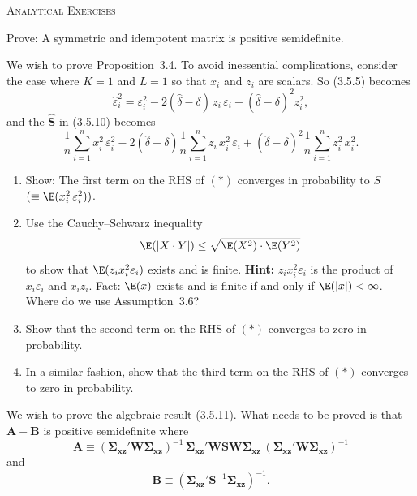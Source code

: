 
\begin{problemset}

\noindent\textsc{Analytical Exercises}
\bigskip

\exercise[1]
Prove: A symmetric and idempotent matrix is positive semidefinite.

\exercise[2]
We wish to prove Proposition~3.4.  To avoid inessential complications, consider
the case where $K = 1$ and $L = 1$ so that $x_i$ and $z_i$ are scalars.  So (3.5.5)
becomes
\[
  \hat{\varepsilon}_i^2 = \varepsilon_i^2
  - 2(\hat{\delta} - \delta)\, z_i\, \varepsilon_i
  + (\hat{\delta} - \delta)^2 z_i^2,
\]
and the $\hat{\mathbf{S}}$ in (3.5.10) becomes
\[
  \frac{1}{n} \sum_{i=1}^{n} x_i^2\, \varepsilon_i^2
  - 2(\hat{\delta} - \delta) \frac{1}{n} \sum_{i=1}^{n} z_i\, x_i^2\, \varepsilon_i
  + (\hat{\delta} - \delta)^2 \frac{1}{n} \sum_{i=1}^{n} z_i^2\, x_i^2.
  \tag{$*$}
\]

\begin{enumerate}[label=(\alph*)]
\item Show: The first term on the RHS of $(*)$ converges in probability to $S$
  $(\equiv \E(x_i^2\, \varepsilon_i^2))$.

\item Use the Cauchy--Schwarz inequality
  \[
    \E(|X \cdot Y|) \leq \sqrt{\E(X^2) \cdot \E(Y^2)}
  \]
  to show that $\E(z_i x_i^2 \varepsilon_i)$ exists and is finite.
  \textbf{Hint:} $z_i x_i^2 \varepsilon_i$ is the product of $x_i \varepsilon_i$ and $x_i z_i$.
  Fact: $\E(x)$ exists and is finite if and only if $\E(|x|) < \infty$.
  Where do we use Assumption~3.6?

\item Show that the second term on the RHS of $(*)$ converges to zero in probability.

\item In a similar fashion, show that the third term on the RHS of $(*)$ converges
  to zero in probability.
\end{enumerate}

\exercise[3]
We wish to prove the algebraic result (3.5.11).  What needs to be proved is that
$\mathbf{A} - \mathbf{B}$ is positive semidefinite where
\[
  \mathbf{A} \equiv
  (\boldsymbol{\Sigma}_{\mathbf{xz}}' \mathbf{W} \boldsymbol{\Sigma}_{\mathbf{xz}})^{-1}\,
  \boldsymbol{\Sigma}_{\mathbf{xz}}' \mathbf{W} \mathbf{S} \mathbf{W}
  \boldsymbol{\Sigma}_{\mathbf{xz}}\,
  (\boldsymbol{\Sigma}_{\mathbf{xz}}' \mathbf{W} \boldsymbol{\Sigma}_{\mathbf{xz}})^{-1}
\]
and
\[
  \mathbf{B} \equiv
  (\boldsymbol{\Sigma}_{\mathbf{xz}}' \mathbf{S}^{-1}
  \boldsymbol{\Sigma}_{\mathbf{xz}})^{-1}.
\]


\end{problemset}
